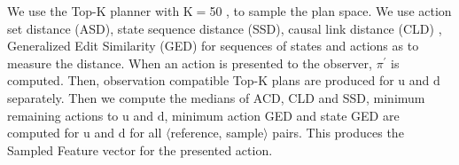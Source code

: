 \documentclass[doctor]{thesis} %
\theoremstyle{plain}
\begin{document}
 We use the Top-K planner with K$=$50 \cite{riabov2014}, to sample the plan space.
We use action set distance (ASD), state sequence distance (SSD), causal link distance (CLD) \cite{nguyen2012generating}, Generalized Edit Similarity (GED) for sequences of states and actions \cite{sohrabi2016finding} as to measure the distance. When an action is presented to the observer, $\pi^\prime$ is computed. Then, observation compatible Top-K plans are produced for $\mathrm{u}$ and $\mathrm{d}$ separately. Then we compute the medians of ACD, CLD and SSD, minimum remaining actions to $\mathrm{u}$ and $\mathrm{d}$, minimum action GED and state GED are computed for $\mathrm{u}$ and $\mathrm{d}$ for all $\langle$reference, sample$\rangle$ pairs. This produces the Sampled Feature vector for the presented action.
%
%
\end{document}
